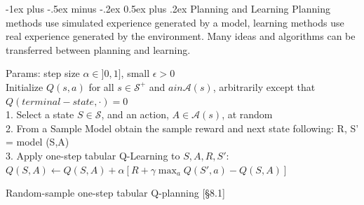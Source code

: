 \documentclass[10pt,landscape]{article}
\makeatletter
\renewcommand{\section}{\@startsection{section}{1}{0mm}%
                                {-1ex plus -.5ex minus -.2ex}%
                                {0.5ex plus .2ex}%
                                {\normalfont\large\bfseries}}
\makeatother
\begin{document}
\begin{multicols}{3}
\section{Planning and Learning}
Planning methods use simulated experience generated by a model, learning methods use real experience generated by the environment. 
Many ideas and algorithms can be transferred between planning and learning.

\begin{algorithm}[H]
 Params: step size $\alpha \in ]0,1]$, small $\epsilon > 0$\\
 Initialize $Q(s,a)$ for all $s \in \mathcal{S}^+$ and $a in \mathcal{A}(s)$, arbitrarily except that $Q(terminal-state, \cdot) = 0$\\
{
	1. Select a state $S \in \mathcal{S}$, and an action, $A \in \mathcal{A}(s)$, at random\\
	2. From a Sample Model obtain the sample reward and next state following: R, S' = model (S,A)\\
	3. Apply one-step tabular Q-Learning to $S, A, R, S'$:\\
	$Q(S, A) \leftarrow Q(S, A) + \alpha \left[R + \gamma \max_a Q(S', a) - Q(S, A)  \right]$\\
 }
\caption{Random-sample one-step tabular Q-planning [§8.1]}
\end{algorithm}


\end{multicols}
\end{document}

